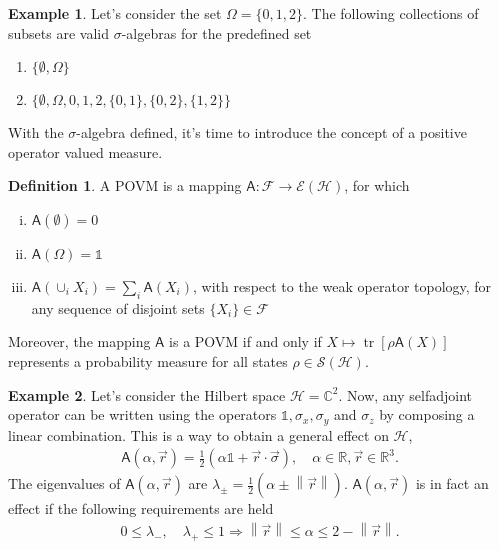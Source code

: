 \documentclass[a4paper,12pt]{wihuri}
\theoremstyle{definition}
\newtheorem{definition}{Definition}
\newtheorem{example}{Example}
\numberwithin{definition}{section}
\numberwithin{example}{section}
\numberwithin{theorem}{section}
\numberwithin{proposition}{section}
\numberwithin{lemma}{section}
\newcommand{\hi}{\mathcal{H}}%
\newcommand{\salg}{\mathcal{F}}%
\newcommand{\tila}{\mathcal{S}}%
\newcommand{\effect}{\mathcal{E}}%
\newcommand{\A}{\mathsf{A}}%
\newcommand{\id}{\mathds{1}}
\newcommand{\cc}{\mathbb{C}^2}%
\newcommand{\real}{\mathbb{R}}%
\DeclareMathOperator{\tr}{tr}
\newcommand{\norm}[1]{\left\lVert#1\right\rVert}
\begin{document}
\begin{example}
Let's consider the set $\Omega = \lbrace 0, 1, 2 \rbrace$. The following collections of subsets are valid $\sigma$-algebras for the predefined set
\begin{enumerate}[$\bullet$]
\item $\lbrace \emptyset, \Omega\rbrace$
\item $\lbrace \emptyset, \Omega, 0, 1, 2, \lbrace 0,1\rbrace, \lbrace0,2\rbrace, \lbrace1,2\rbrace \rbrace$
\end{enumerate}

\end{example}
With the $\sigma$-algebra defined, it's time to introduce the concept of a positive operator valued measure.
\begin{definition}
A POVM is a mapping $\A : \salg \rightarrow \effect(\hi)$, for which
\begin{enumerate}[i)]
\item $\A(\emptyset) = 0$
\item $\A(\Omega) = \id$
\item $\A(\cup_i X_i) = \sum_i \A(X_i)$, \quad with respect to the weak operator topology, for any sequence of disjoint sets $\lbrace X_i \rbrace \in \salg$
\end{enumerate}
\end{definition} 
\noindent Moreover, the mapping $\A$ is a POVM if and only if $X \mapsto \tr[\rho \A(X)]$ represents a probability measure for all states $\rho \in \tila(\hi)$.


\begin{example}\label{qubitobs}
Let's consider the Hilbert space $\hi = \cc$. Now, any selfadjoint operator can be written using the operators $\id, \sigma_x, \sigma_y$ and $\sigma_z$ by composing a linear combination. This is a way to obtain a general effect on $\hi$,
\begin{align*}
\A(\alpha, \vec{r}) = \frac{1}{2}(\alpha \id + \vec{r}\cdot\vec{\sigma}), \quad \alpha \in \real, \vec{r} \in \real^3\text{.}
\end{align*}
The eigenvalues of $\A(\alpha, \vec{r})$ are $\lambda_{\pm} = \frac{1}{2}(\alpha \pm \norm{\vec{r}})$. $\A(\alpha, \vec{r})$ is in fact an effect if the following requirements are held
\begin{align*}
0 \leq \lambda_{-}, \quad \lambda_{+} \leq 1 \Rightarrow \norm{\vec{r}} \leq \alpha \leq 2 - \norm{\vec{r}}\text{.}
\end{align*}
\end{example}
\end{document}

